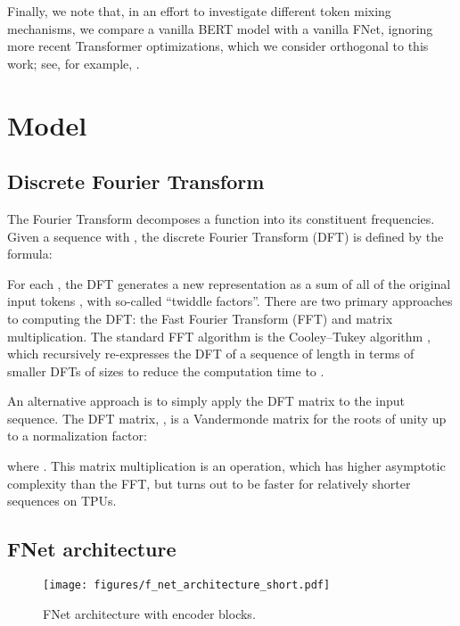 \documentclass[11pt]{article}
\renewcommand{\O}[1]{}
\begin{document}
Finally, we note that, in an effort to investigate different token mixing mechanisms, we compare a vanilla BERT model \citep{devlin2018bert} with a vanilla FNet, ignoring more recent Transformer optimizations, which we consider orthogonal to this work; see, for example, \citep{narang2021transformer, kim2020fastformers, shleifer2020pre}.
 \section{Model}
\label{sec:model}

\subsection{Discrete Fourier Transform}
\label{subsec:dft_background}

The Fourier Transform decomposes a function into its constituent frequencies. Given a sequence  with , the discrete Fourier Transform (DFT) is defined by the formula:

For each , the DFT generates a new representation  as a sum of all of the original input tokens , with so-called ``twiddle factors''.
There are two primary approaches to computing the DFT: the Fast Fourier Transform (FFT) and matrix multiplication. The standard FFT algorithm is the Cooley–Tukey algorithm \citep{cooley1965algorithm, frigo2005design}, which recursively re-expresses the DFT of a sequence of length  in terms of  smaller DFTs of sizes  to reduce the computation time to \O{N \log N}. 

An alternative approach is to simply apply the DFT matrix to the input sequence. The DFT matrix, , is a Vandermonde matrix for the roots of unity up to a normalization factor:

where  .
This matrix multiplication is an \O{N^2} operation, which has higher asymptotic complexity than the FFT, but turns out to be faster for relatively shorter sequences on TPUs.


\subsection{FNet architecture}
\label{subsec:architecture}

\begin{figure}
    \centering
    \texttt{[image: figures/f\_net\_architecture\_short.pdf]}
    \caption{FNet architecture with  encoder blocks.}
    \label{fig:architecture}
\end{figure}
\end{document}
